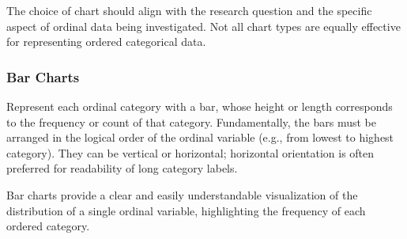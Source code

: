 \documentclass[
  letterpaper,
  DIV=11,
  numbers=noendperiod]{scrartcl}
\begin{document}
The choice of chart should align with the research question and the
specific aspect of ordinal data being investigated. Not all chart types
are equally effective for representing ordered categorical data.

\hypertarget{bar-charts}{%
\subsubsection*{Bar Charts}\label{bar-charts}}

Represent each ordinal category with a bar, whose height or length
corresponds to the frequency or count of that category. Fundamentally,
the bars must be arranged in the logical order of the ordinal variable
(e.g., from lowest to highest category). They can be vertical or
horizontal; horizontal orientation is often preferred for readability of
long category labels.

Bar charts provide a clear and easily understandable visualization of
the distribution of a single ordinal variable, highlighting the
frequency of each ordered category.
\end{document}
